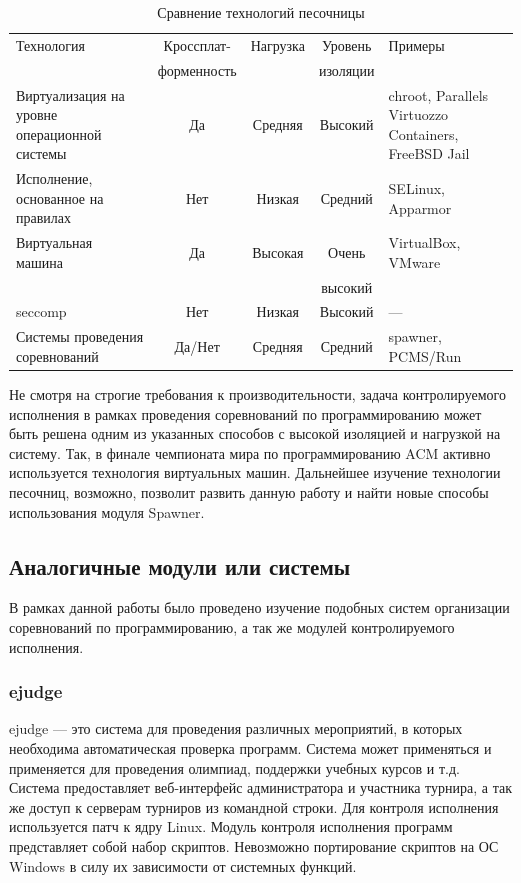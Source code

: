 \documentclass{imcs}
\begin{document}
\begin{table}[h!]
\begin{center}
\begin{tabularx}{\textwidth}{|X|c|c|c|X|}
\hline
  Технология &  Кроссплат-  &  Нагрузка  &  Уровень  &  Примеры \\
   &  форменность  &    &  изоляции  &   \\
\hline
 Виртуализация на уровне операционной системы & Да & Средняя & Высокий & chroot, Parallels Virtuozzo Containers, FreeBSD Jail \\
\hline
 Исполнение, основанное на правилах & Нет & Низкая & Средний & SELinux, Apparmor \\
\hline
Виртуальная машина & Да & Высокая & Очень & VirtualBox, VMware \\
  &  &  & высокий & \\
\hline
seccomp & Нет & Низкая & Высокий & --- \\
\hline
Системы проведения соревнований & Да/Нет & Средняя & Средний & spawner, PCMS/Run \\
\hline
\end{tabularx}
\caption{Сравнение технологий песочницы}\label{tab:sandboxing_comparison}
\end{center}
\end{table}
Не смотря на строгие требования к производительности, задача контролируемого исполнения в рамках проведения соревнований по программированию может быть решена одним из указанных способов с высокой изоляцией и нагрузкой на систему. Так, в финале чемпионата мира по программированию ACM активно используется технология виртуальных машин.
Дальнейшее изучение технологии песочниц, возможно, позволит развить данную работу и найти новые способы использования модуля Spawner.
\subsection{Аналогичные модули или системы}

В рамках данной работы было проведено изучение подобных систем организации соревнований по программированию, а так же модулей контролируемого исполнения.
\subsubsection{ejudge}   
ejudge\cite{ejudge} --- это система для проведения различных мероприятий, в которых необходима автоматическая проверка программ. Система может применяться и применяется для проведения олимпиад, поддержки учебных курсов и т.д.
Система предоставляет веб-интерфейс администратора и участника турнира, а так же доступ к серверам турниров из командной строки.
Для контроля исполнения используется патч к ядру Linux. Модуль контроля исполнения программ представляет собой набор скриптов. Невозможно портирование скриптов на ОС Windows в силу их зависимости от системных функций.
\end{document}
